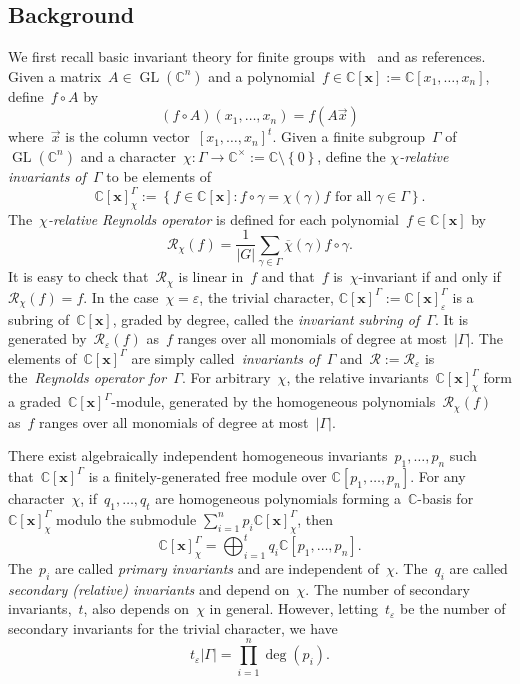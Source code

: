 \documentclass{amsart}
\DeclareMathOperator{\GL}{GL}
\newcommand{\C}{\mathbb{C}}
\newcommand{\polyring}{\C[\mathbf{x}]}
\begin{document}
\subsection{Background}
We first recall basic invariant theory for finite groups with~\cite{Stanley}
and\cite{Sturmfels} as references.  Given a matrix~$A\in\GL(\C^n)$ and a
polynomial~$f\in\polyring:=\C[x_1,\dots,x_n]$, define~$f\circ A$ by
\[
  (f\circ A)(x_1,\dots,x_n)=f(A\vec{x})
\]
where~$\vec{x}$ is the column vector~$[x_1,\dots,x_n]^t$.  Given a finite
subgroup~$\Gamma$ of~$\GL(\C^n)$ and a
character~$\chi\colon\Gamma\to\C^{\times}:=\C\setminus\left\{ 0 \right\}$,
define the {\em $\chi$-relative invariants of~$\Gamma$} to be elements of 
\[
  \polyring^{\Gamma}_{\chi}:=\left\{ f\in\polyring: f\circ\gamma=\chi(\gamma)f
  \text{ for all~$\gamma\in\Gamma$} \right\}.
\]
The~{\em $\chi$-relative Reynolds operator} is defined for each
polynomial~$f\in\polyring$ by
\[
  \mathcal{R}_{\chi}(f)=\frac{1}{|G|}\sum_{\gamma\in\Gamma}\overline{\chi}(\gamma)f\circ\gamma.
\]
It is easy to check that~$\mathcal{R}_{\chi}$ is linear in~$f$ and that~$f$
is~$\chi$-invariant if and only if~$\mathcal{R}_{\chi}(f)=f$.  In the
case~$\chi=\varepsilon$, the trivial character,
$\polyring^{\Gamma}:=\polyring^{\Gamma}_{\varepsilon}$ is a subring
of~$\polyring$, graded by degree, called the {\em invariant subring
of~$\Gamma$}.  It is generated by~$\mathcal{R}_{\varepsilon}(f)$ as~$f$ ranges
over all monomials of degree at most~$|\Gamma|$. The elements
of~$\polyring^{\Gamma}$ are simply called~{\em invariants of~$\Gamma$}
and~$\mathcal{R}:=\mathcal{R}_{\varepsilon}$ is the~{\em Reynolds operator
for~$\Gamma$}.  For arbitrary~$\chi$, the relative
invariants~$\polyring^{\Gamma}_{\chi}$ form a
graded~$\polyring^{\Gamma}$-module, generated by the homogeneous
polynomials~$\mathcal{R}_{\chi}(f)$ as~$f$ ranges over all monomials of degree
at most~$|\Gamma|$. 

There exist algebraically independent homogeneous
invariants~$p_1,\dots,p_n$ such that~$\polyring^{\Gamma}$ is a
finitely-generated free module over $\C[p_1,\dots,p_n]$.
For any character~$\chi$, if~$q_1,\dots,q_t$ are homogeneous polynomials
forming a~$\C$-basis for~$\polyring^{\Gamma}_{\chi}$ modulo the
submodule $\sum_{i=1}^np_i\polyring^{\Gamma}_{\chi}$, then
\[
  \polyring_{\chi}^{\Gamma}=\bigoplus_{i=1}^{t}q_i\C[p_1,\dots,p_n].
\]
The~$p_i$ are called {\em primary invariants} and are independent of~$\chi$.
The~$q_i$ are called {\em secondary (relative) invariants} and depend
on~$\chi$. The number of secondary invariants,~$t$, also
depends on~$\chi$ in general.  However, letting~$t_{\varepsilon}$ be the number of
secondary invariants for the trivial character, we have
\[
  t_{\varepsilon}|\Gamma|=\prod_{i=1}^n\deg(p_i).
\]
\end{document}
